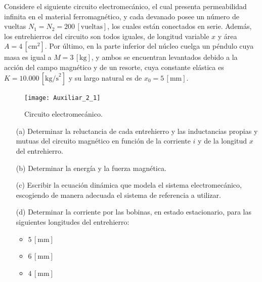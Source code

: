\documentclass[
  11pt,
  letterpaper,
   addpoints,
   answers
  ]{exam}
\begin{document}
\begin{questions}
    \question Considere el siguiente circuito electromecánico, el cual presenta permeabilidad infinita en el material ferromagnético, y cada devanado posee un número de vueltas \( N_1 = N_2 = 200 \, [\text{vueltas}] \), los cuales están conectados en serie. Además, los entrehierros del circuito son todos iguales, de longitud variable \( x \) y área \( A = 4 \, [\text{cm}^2] \). Por último, en la parte inferior del núcleo cuelga un péndulo cuya masa es igual a \( M = 3 \, [\text{kg}] \), y ambos se encuentran levantados debido a la acción del campo magnético y de un resorte, cuya constante elástica es \( K = 10.000 \, [\text{kg/s}^2] \) y su largo natural es de \( x_0 = 5 \, [\text{mm}] \).
    \begin{figure}[h!]
        \centering
        \texttt{[image: Auxiliar\_2\_1]}
        \caption{Circuito electromecánico.}
    \end{figure}

    \begin{enumerate}
        \item[(a)] Determinar la reluctancia de cada entrehierro y las inductancias propias y mutuas del circuito magnético en función de la corriente \( i \) y de la longitud \( x \) del entrehierro.
        \item[(b)] Determinar la energía y la fuerza magnética.
        \item[(c)] Escribir la ecuación dinámica que modela el sistema electromecánico, escogiendo de manera adecuada el sistema de referencia a utilizar.
        \item[(d)] Determinar la corriente por las bobinas, en estado estacionario, para las siguientes longitudes del entrehierro:
        \begin{itemize}
            \item \( 5 \, [\text{mm}] \)
            \item \( 6 \, [\text{mm}] \)
            \item \( 4 \, [\text{mm}] \)
        \end{itemize}
    \end{enumerate}
    \begin{solution}

\end{solution}
\end{questions}
\end{document}
